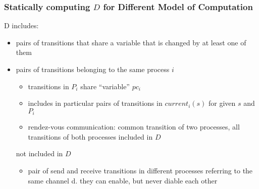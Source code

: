 \documentclass[a4paper, 10pt]{article}
\begin{document}
\subsubsection*{Statically computing $D$ for Different Model of Computation}
D includes:
\begin{itemize}
    \item pairs of transitions that share a variable that is changed by at least one of them
    \item pairs of transitions belonging to the same process $i$
    \begin{itemize}
        \item transitions in $P_i$ share ``variable'' $pc_i$
        \item includes in particular pairs of transitions in $current_i(s)$ for given $s$ and $P_i$
        \item rendez-vous communication: common transition of two processes, all transitions of both processes included in $D$
    \end{itemize}
not included in $D$
\begin{itemize}
    \item pair of send and receive transitions in different processes referring to the same channel d. {\tiny they can enable, but never diable each other}
\end{itemize}
\end{itemize}




\end{document}
